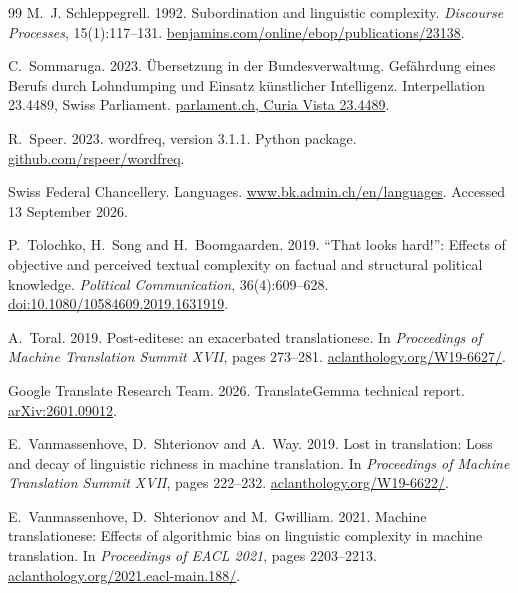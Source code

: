 \documentclass[11pt,a4paper]{article}
\begin{document}
\begin{thebibliography}{99}
M.~J. Schleppegrell. 1992. Subordination and linguistic complexity.
\emph{Discourse Processes}, 15(1):117--131. \href{https://benjamins.com/online/ebop/publications/23138}{benjamins.com/online/ebop/publications/23138}.

C.~Sommaruga. 2023. \"Ubersetzung in der Bundesverwaltung. Gef\"ahrdung eines Berufs
durch Lohndumping und Einsatz k\"unstlicher Intelligenz. Interpellation 23.4489,
Swiss Parliament. \href{https://www.parlament.ch/de/ratsbetrieb/suche-curia-vista/geschaeft?AffairId=20234489}{parlament.ch, Curia Vista 23.4489}.

R.~Speer. 2023. wordfreq, version 3.1.1. Python package.
\href{https://github.com/rspeer/wordfreq}{github.com/rspeer/wordfreq}.

Swiss Federal Chancellery. Languages. \href{https://www.bk.admin.ch/en/languages}{www.bk.admin.ch/en/languages}.
Accessed 13 September 2026.

P.~Tolochko, H.~Song and H.~Boomgaarden. 2019. ``That looks hard!'': Effects of
objective and perceived textual complexity on factual and structural political
knowledge. \emph{Political Communication}, 36(4):609--628.
\href{https://doi.org/10.1080/10584609.2019.1631919}{doi:10.1080/10584609.2019.1631919}.

A.~Toral. 2019. Post-editese: an exacerbated translationese. In
\emph{Proceedings of Machine Translation Summit XVII}, pages 273--281.
\href{https://aclanthology.org/W19-6627/}{aclanthology.org/W19-6627/}.

Google Translate Research Team. 2026. TranslateGemma technical report.
\href{https://arxiv.org/abs/2601.09012}{arXiv:2601.09012}.

E.~Vanmassenhove, D.~Shterionov and A.~Way. 2019. Lost in translation: Loss and
decay of linguistic richness in machine translation. In \emph{Proceedings of
Machine Translation Summit XVII}, pages 222--232. \href{https://aclanthology.org/W19-6622/}{aclanthology.org/W19-6622/}.

E.~Vanmassenhove, D.~Shterionov and M.~Gwilliam. 2021. Machine translationese:
Effects of algorithmic bias on linguistic complexity in machine translation. In
\emph{Proceedings of EACL 2021}, pages 2203--2213.
\href{https://aclanthology.org/2021.eacl-main.188/}{aclanthology.org/2021.eacl-main.188/}.

\end{thebibliography}
\end{document}

